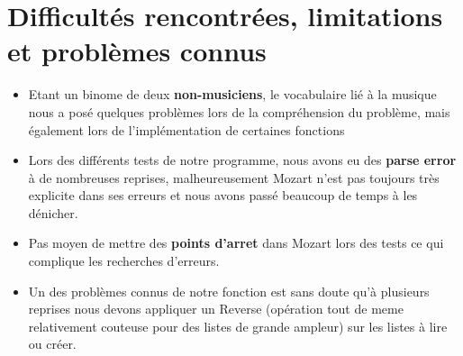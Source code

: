 \documentclass[a4paper,12pt]{report}
\begin{document}
\section*{Difficultés rencontrées, limitations et problèmes connus}
\begin{itemize}
\item Etant un binome de deux \textbf{non-musiciens}, le vocabulaire lié à la musique nous a posé quelques problèmes lors de la compréhension du problème, mais également lors de l'implémentation de certaines fonctions

\item Lors des différents tests de notre programme, nous avons eu des \textbf{parse error} à de nombreuses reprises, malheureusement Mozart n'est pas toujours très explicite dans ses erreurs et nous avons passé beaucoup de temps à les dénicher. 
 
\item Pas moyen de mettre des \textbf{points d'arret} dans Mozart lors des tests ce qui complique les recherches d'erreurs.

\item Un des problèmes connus de notre fonction est sans doute qu'à plusieurs reprises nous devons appliquer un Reverse (opération tout de meme relativement couteuse pour des listes de grande ampleur) sur les listes à lire ou créer. 

 
\end{itemize}
\end{document}
